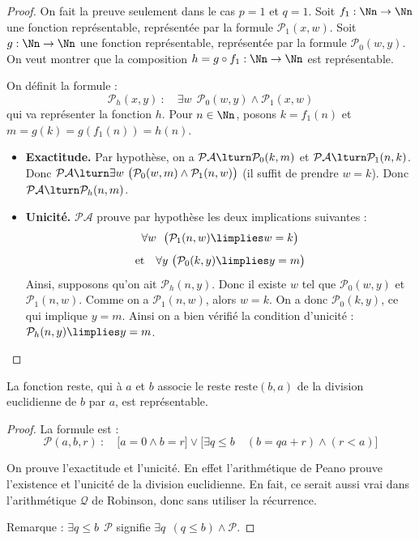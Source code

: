 \documentclass[11pt,class=report,crop=false]{standalone}
\begin{document}
\begin{proof}
    On fait la preuve seulement dans le cas $p=1$ et $q=1$.
    Soit $f_1 : \Nn \to \Nn$ une fonction représentable, représentée par la formule $\mathcal{P}_1(x, w)$.
    Soit $g : \Nn \to \Nn$ une fonction représentable, représentée par la formule $\mathcal{P}_0(w, y)$.
    On veut montrer que la composition $h = g \circ f_1 : \Nn \to \Nn$ est représentable.

    On définit la formule :
    \[ \mathcal{P}_h(x,y) \ : \quad \exists w \ \ \mathcal{P}_0(w, y) \land \mathcal{P}_1(x, w)  \]
    qui va représenter la fonction $h$.
    Pour $n \in \Nn$, posons $k = f_1(n)$ et $m = g(k) = g(f_1(n)) = h(n)$.


    \begin{itemize}
        \item \textbf{Exactitude.} 
        Par hypothèse, on a $\mathcal{PA} \lturn \mathcal{P}_0(k, m)$ et $\mathcal{PA} \lturn \mathcal{P}_1(n, k)$.
        Donc $\mathcal{PA} \lturn \exists w \ \big( \mathcal{P}_0(w, m) \land \mathcal{P}_1(n, w) \big)$ (il suffit de prendre $w = k$).
        Donc $\mathcal{PA} \lturn \mathcal{P}_h(n, m)$.

        \item \textbf{Unicité.} $\mathcal{PA}$ prouve par hypothèse les deux implications suivantes :
        \[ \forall w \ \ \big( \mathcal{P}_1(n, w) \limplies w = k \big) \]
        \[ \text{et} \quad \forall y \ \big( \mathcal{P}_0(k, y) \limplies y = m \big) \]
        Ainsi, supposons qu'on ait $\mathcal{P}_h(n, y)$. Donc il existe $w$ tel que $\mathcal{P}_0(w, y)$ et $\mathcal{P}_1(n, w)$.
        Comme on a $\mathcal{P}_1(n, w)$, alors $w = k$.
        On a donc $\mathcal{P}_0(k, y)$, ce qui implique $y = m$.
        Ainsi on a bien vérifié la condition d'unicité :
        $\mathcal{P}_h(n,y) \limplies y = m$.
    \end{itemize}
\end{proof}


\begin{proposition}
    La fonction reste, qui à $a$ et $b$ associe le reste $\text{reste}(b,a)$ de la division euclidienne de $b$ par $a$, est représentable.
\end{proposition}

\begin{proof}
    La formule est :
    \[ \mathcal{P}(a,b,r) \ : \quad  \big[a = 0 \land b = r\big] \lor \big[\exists q \le b \quad (b = qa+r) \land (r < a) \big] \]

    On prouve l'exactitude et l'unicité. En effet l'arithmétique de Peano prouve l'existence et l'unicité de la division euclidienne.
    En fait, ce serait aussi vrai dans l'arithmétique $\mathcal{Q}$ de Robinson, donc sans utiliser la récurrence.

    Remarque : \og{}$\exists q \le b \ \ \mathcal{P}$\fg{} signifie \og{}$\exists q \ \ (q \le b) \land \mathcal{P}$\fg{}.
\end{proof}
\end{document}
